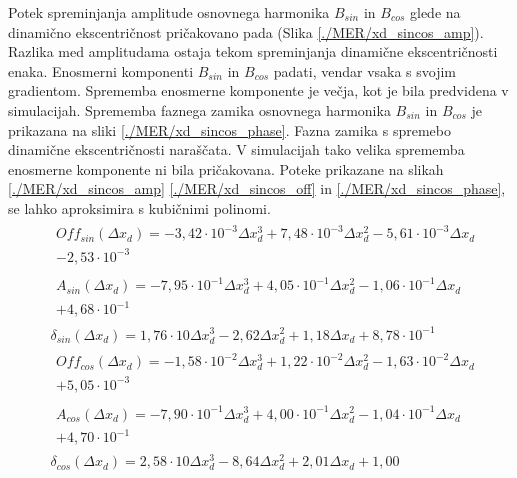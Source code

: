 Potek spreminjanja amplitude osnovnega harmonika $B_{sin}$ in $B_{cos}$ glede na dinamično ekscentričnost pričakovano pada (Slika \ref{./MER/xd_sincos_amp}). Razlika med amplitudama ostaja tekom spreminjanja dinamične ekscentričnosti enaka. Enosmerni komponenti $B_{sin}$ in $B_{cos}$ padati, vendar vsaka s svojim gradientom. Sprememba enosmerne komponente je večja, kot je bila predvidena v simulacijah. Sprememba faznega zamika osnovnega harmonika $B_{sin}$ in $B_{cos}$ je prikazana na sliki \ref{./MER/xd_sincos_phase}. Fazna zamika s spremebo dinamične ekscentričnosti naraščata. V simulacijah tako velika sprememba enosmerne komponente ni bila pričakovana.
\newpage
Poteke prikazane na slikah \ref{./MER/xd_sincos_amp} \ref{./MER/xd_sincos_off} in \ref{./MER/xd_sincos_phase}, se lahko aproksimira s kubičnimi polinomi.
\begin{eqnarray}
&\begin{split}Off_{sin}(\Delta x_d) =-3,42\cdot 10^{-3}\Delta x_d^{3}+7,48\cdot 10^{-3}\Delta x_d^{2}-5,61\cdot 10^{-3}\Delta x_d\\-2,53\cdot 10^{-3} \end{split}\\
&\begin{split}A_{sin}(\Delta x_d) =-7,95\cdot 10^{-1}\Delta x_d^{3}+4,05\cdot 10^{-1}\Delta x_d^{2}-1,06\cdot 10^{-1}\Delta x_d\\+4,68\cdot 10^{-1} \end{split} \\  
&\delta_{sin} (\Delta x_d) =1,76\cdot 10\Delta x_d^{3}-2,62\Delta x_d^{2}+1,18\Delta x_d+8,78\cdot 10^{-1} \\                                    
&\begin{split}Off_{cos}(\Delta x_d) =-1,58\cdot 10^{-2}\Delta x_d^{3}+1,22\cdot 10^{-2}\Delta x_d^{2}-1,63\cdot 10^{-2}\Delta x_d\\+5,05\cdot 10^{-3} \end{split}\\
&\begin{split}A_{cos}(\Delta x_d) =-7,90\cdot 10^{-1}\Delta x_d^{3}+4,00\cdot 10^{-1}\Delta x_d^{2}-1,04\cdot 10^{-1}\Delta x_d\\+4,70\cdot 10^{-1} \end{split}\\  
&\delta_{cos}(\Delta x_d) =2,58\cdot 10\Delta x_d^{3}-8,64\Delta x_d^{2}+2,01\Delta x_d+1,00
\end{eqnarray}
